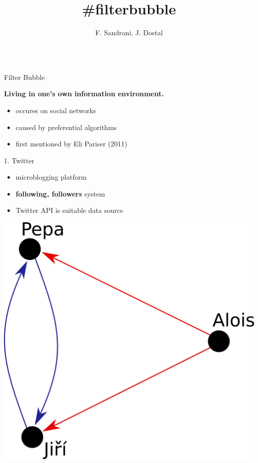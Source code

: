 \documentclass{beamer}
\title{\#filterbubble}
\author[dostal.jakub@outlook.com]{F. Sandroni, J. Dostal}
\begin{document}
\begin{frame}[fragile]
\begin{columns}[T]
\begin{column}{.33\textwidth}
\begin{block}{Filter Bubble}
    \center
    \begin{large}\textbf{Living in one's own information environment.}\end{large}
    \vspace{0.8cm}
    \begin{itemize}
        \item occures on social networks
        \item caused by preferential algorithms
        \item first mentioned by Eli Pariser (2011)
    \end{itemize}
\end{block}
\begin{blankblock}{1. Twitter}
	\begin{itemize}
		\item microblogging platform
        \item \textbf{following, followers} system
		\item Twitter API is suitable data source
	\end{itemize}
	\center
	\includegraphics[scale=0.55]{./Pics/pepa.png}

\end{blankblock}
\end{column}
\end{columns}
\end{frame}
\end{document}
